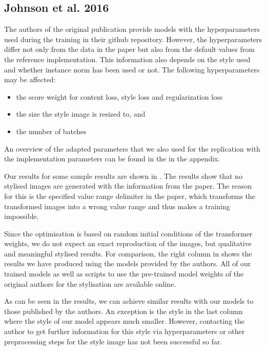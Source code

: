 \subsection{Johnson et al. 2016}

The authors of the original publication provide models with the hyperparameters used during the training in their github repository. However, the hyperparameters differ not only from the data in the paper but also from the default values from the reference implementation. This information also depends on the style used and whether instance norm has been used or not. The following hyperparameters may be affected:

\begin{itemize}
	\item the score weight for content loss, style loss and regularization loss
	\item the size the style image is resized to, and
	\item the number of batches
\end{itemize}

An overview of the adapted parameters that we also used for the replication with the implementation parameters can be found in the  in the appendix.

Our results for some sample results are shown in . The results show that no stylised images are generated with the information from the paper. The reason for this is the specified value range delimiter in the paper, which transforms the transformed images into a wrong value range and thus makes a training impossible.

Since the optimisation is based on random initial conditions of the transformer weights, we do not expect an exact reproduction of the images, but qualitative and meaningful stylised results. For comparison, the right column in  shows the results we have produced using the models provided by the authors. All of our trained models as well as scripts to use the pre-trained model weights of the original authors for the stylisation are available online.

As can be seen in the results, we can achieve similar results with our models to those published by the authors. An exception is the style in the last column where the style of our model appears much smaller. However, contacting the author to get further information for this style via hyperparameters or other preprocessing steps for the style image has not been successful so far.

